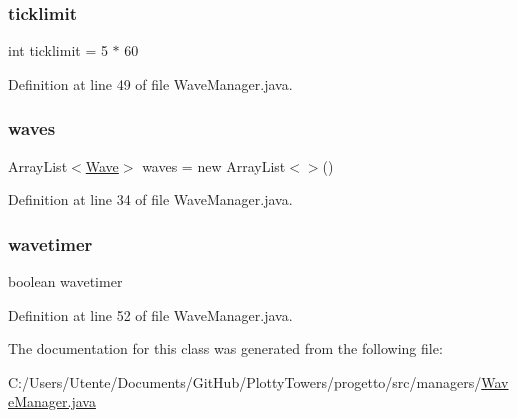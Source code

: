 \subsubsection{\texorpdfstring{ticklimit}{ticklimit}}
{\footnotesize\ttfamily int ticklimit = 5 $\ast$ 60\hspace{0.3cm}{\ttfamily [private]}}



Definition at line 49 of file Wave\+Manager.\+java.

\mbox{\label{classmanagers_1_1_wave_manager_a8ef0454bb56915f114dd34cece9ef71d}} 
\subsubsection{\texorpdfstring{waves}{waves}}
{\footnotesize\ttfamily Array\+List$<$\hyperlink{classevents_1_1_wave}{Wave}$>$ waves = new Array\+List$<$$>$()\hspace{0.3cm}{\ttfamily [private]}}



Definition at line 34 of file Wave\+Manager.\+java.

\mbox{\label{classmanagers_1_1_wave_manager_a2fa0a649e48706285ad6c2b814f4855b}} 
\subsubsection{\texorpdfstring{wavetimer}{wavetimer}}
{\footnotesize\ttfamily boolean wavetimer\hspace{0.3cm}{\ttfamily [private]}}



Definition at line 52 of file Wave\+Manager.\+java.



The documentation for this class was generated from the following file\+:\begin{DoxyCompactItemize}
\item 
C\+:/\+Users/\+Utente/\+Documents/\+Git\+Hub/\+Plotty\+Towers/progetto/src/managers/\hyperlink{_wave_manager_8java}{Wave\+Manager.\+java}\end{DoxyCompactItemize}
